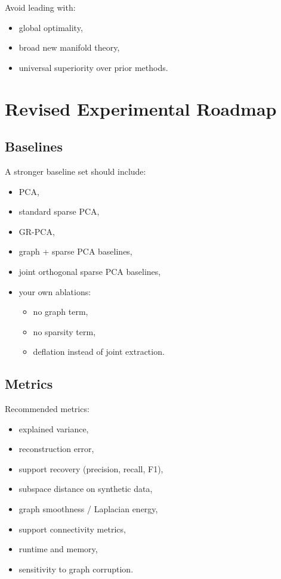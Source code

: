 \documentclass[11pt]{article}
\begin{document}
Avoid leading with:
\begin{itemize}
    \item global optimality,
    \item broad new manifold theory,
    \item universal superiority over prior methods.
\end{itemize}

\section{Revised Experimental Roadmap}

\subsection{Baselines}

A stronger baseline set should include:
\begin{itemize}
    \item PCA,
    \item standard sparse PCA,
    \item GR-PCA,
    \item graph + sparse PCA baselines,
    \item joint orthogonal sparse PCA baselines,
    \item your own ablations:
    \begin{itemize}
        \item no graph term,
        \item no sparsity term,
        \item deflation instead of joint extraction.
    \end{itemize}
\end{itemize}

\subsection{Metrics}

Recommended metrics:
\begin{itemize}
    \item explained variance,
    \item reconstruction error,
    \item support recovery (precision, recall, F1),
    \item subspace distance on synthetic data,
    \item graph smoothness / Laplacian energy,
    \item support connectivity metrics,
    \item runtime and memory,
    \item sensitivity to graph corruption.
\end{itemize}
\end{document}
